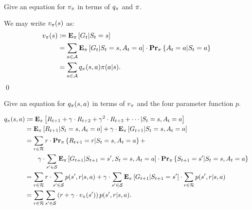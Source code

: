 \begin{exer}
Give an equation for $v_{\pi}$ in terms of $q_{\pi}$ and $\pi$.
\end{exer}
\begin{solution}
We may write $v_{\pi}(s)$ as:
\begin{align*}
    v_{\pi}(s) & \coloneqq \mathbf{E}_{\pi} \left [ G_t \vert S_t = s \right ] \\
                   & = \sum_{a \in \mathcal{A}} \mathbf{E}_{\pi} \left [ G_t \vert S_t = s, A_t = a \right ] 
                        \cdot \mathbf{Pr}_{\pi} \left \{ A_t = a \vert S_t = a \right \} \\
                   & = \sum_{a \in \mathcal{A}} q_{\pi}(s, a) \pi (a \vert s).
\end{align*}
\qed
\end{solution}

\begin{exer}
Give an equation for $q_{\pi} (s, a)$ in terms of $v_{\pi}$ and the 
four parameter function $p$. 
\end{exer}
\begin{solution}
\begin{align*}
    q_{\pi}(s, a) & \coloneqq \mathbf{E}_{\pi} \left [ R_{t + 1} + \gamma \cdot R_{t + 2} + \gamma^2 \cdot R_{t + 3} + \cdots \vert S_t = s, A_t = a \right ] \\
                  & = \mathbf{E}_{\pi} \left [ R_{t + 1} \vert S_t = s, A_t = a \right ] + 
                    \gamma \cdot \mathbf{E}_{\pi} \left [ G_{t + 1} \vert S_t = s, A_t = a \right ] \\
                  & = \sum_{r \in \mathcal{R}} r \cdot \mathbf{Pr}_{\pi} \left \{ R_{t + 1} = r \vert S_t = s, A_t = a \right \} + \\
                  & \quad \quad \gamma \cdot \sum_{s' \in \mathcal{S}} \mathbf{E}_{\pi} \left [ G_{t + 1} \vert S_{t + 1} = s', S_t = s, A_t = a \right ]
                        \cdot \mathbf{Pr}_{\pi} \left \{ S_{t + 1} = s' \vert S_t = s, A_t = a \right \} \\ 
                  & = \sum_{r \in \mathcal{R}} r \cdot \sum_{s' \in \mathcal{S}} p(s', r \vert s, a) + 
                    \gamma \cdot \sum_{s' \in \mathcal{S}} \mathbf{E}_{\pi} \left [ G_{t + 1} \vert S_{t + 1} = s' \right ] 
                        \cdot \sum_{r \in \mathcal{R}} p(s', r \vert s, a) \\
                  & = \sum_{r \in \mathcal{R}} \sum_{s' \in \mathcal{S}} \left ( r + \gamma \cdot v_{\pi}(s') \right )p(s', r \vert s, a).
\end{align*}
\end{solution}
